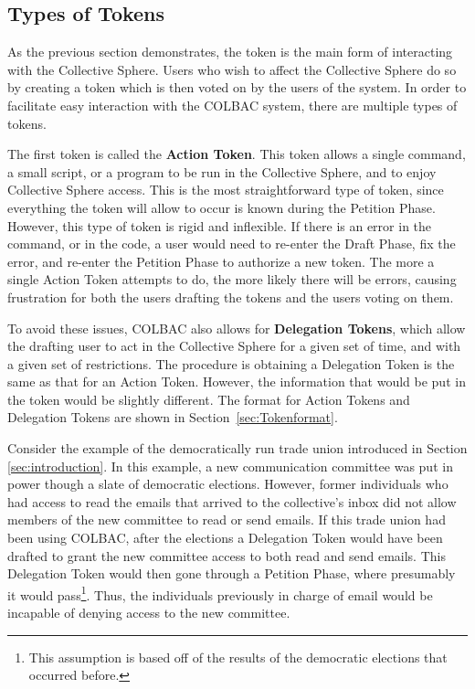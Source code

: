 \subsection{Types of Tokens}
\label{sec:Tokentypes}
As the previous section demonstrates, the token is the main form of interacting
with the Collective Sphere. Users who wish to affect the Collective Sphere do
so by creating a token which is then voted on by the users of the system. In
order to facilitate easy interaction with the COLBAC system, there are multiple
types of tokens.

The first token is called the \textbf{Action Token}. This token allows a single
command, a small script, or a program to be run in the Collective Sphere, and to
enjoy Collective Sphere access. This is the most straightforward type of token,
since everything the token will allow to occur is known during the Petition
Phase. However, this type of token is rigid and inflexible. If there is an error
in the command, or in the code, a user would need to re-enter the Draft Phase,
fix the error, and re-enter the Petition Phase to authorize a new token. The
more a single Action Token attempts to do, the more likely there will be errors,
causing frustration for both the users drafting the tokens and the users voting
on them.

To avoid these issues, COLBAC also allows for \textbf{Delegation Tokens}, which
allow the drafting user to act in the Collective Sphere for a given set of time,
and with a given set of restrictions. The procedure is obtaining a Delegation
Token is the same as that for an Action Token. However, the information that
would be put in the token would be slightly different. The format for Action
Tokens and Delegation Tokens are shown in Section~\ref{sec:Tokenformat}.

Consider the example of the democratically run trade union introduced in Section 
\ref{sec:introduction}. In this example, a new communication committee was put
in power though a slate of democratic elections. However, former individuals who
had access to read the emails that arrived to the collective's inbox did not
allow members of the new committee to read or send emails. If this trade union
had been using COLBAC, after the elections a Delegation Token would have been
drafted to grant the new committee access to both read and send emails. This
Delegation Token would then gone through a Petition Phase, where presumably it
would pass\footnote{This assumption is based off of the results of the
democratic elections that occurred before.}. Thus, the individuals previously in
charge of email would be incapable of denying access to the new committee.

